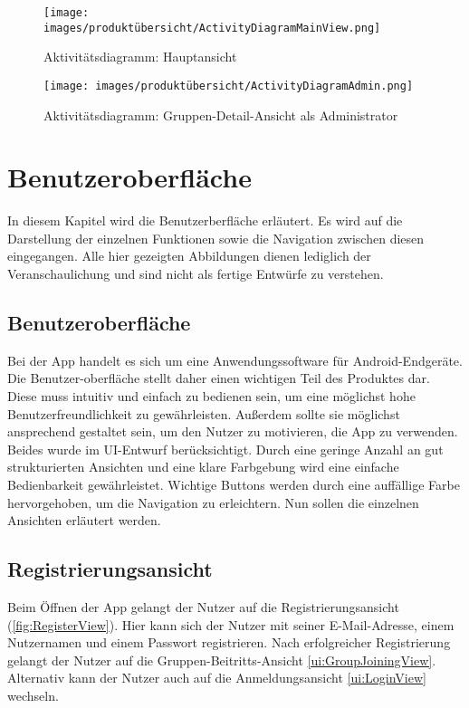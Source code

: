 \documentclass[parskip=full]{scrartcl}
\newcommand{\changelocaltocdepth}[1]{%
  \addtocontents{toc}{\protect\setcounter{tocdepth}{#1}}%
  \setcounter{tocdepth}{#1}%
}
\newcommand{\enablesubsectionnumbering}[1]{
    \renewcommand{\thesubsection}{$\langle$#1\arabic{subsection}0$\rangle$}
    \changelocaltocdepth{1} 
}
\begin{document}
\begin{figure}[!htp]
    \centering
    \texttt{[image: images/produktübersicht/ActivityDiagramMainView.png]}
    \caption{Aktivitätsdiagramm: Hauptansicht}
    \label{fig:ActivityDiagramMainView}
\end{figure}
\newpage

\begin{figure}[!htp]
    \centering
    \begin{adjustbox}{right=150mm}
        \texttt{[image: images/produktübersicht/ActivityDiagramAdmin.png]}
    \end{adjustbox}

    \caption{Aktivitätsdiagramm: Gruppen-Detail-Ansicht als Administrator}
    \label{fig:ActivityDiagramAdmin}
\end{figure}
\newpage

\section{Benutzeroberfläche}
\setcounter{figure}{0} 
\enablesubsectionnumbering{UI}
In diesem Kapitel wird die Benutzerberfläche erläutert. Es wird auf die Darstellung der einzelnen Funktionen sowie die Navigation zwischen diesen eingegangen. Alle hier gezeigten Abbildungen dienen lediglich der Veranschaulichung und sind nicht als fertige Entwürfe zu verstehen.

\subsection*{Benutzeroberfläche}
Bei der App handelt es sich um eine Anwendungssoftware für Android-Endgeräte. Die Benutzer-oberfläche stellt daher einen wichtigen Teil des Produktes dar. Diese muss intuitiv und einfach zu bedienen sein, um eine möglichst hohe Benutzerfreundlichkeit zu gewährleisten. Außerdem sollte sie möglichst ansprechend gestaltet sein, um den Nutzer zu motivieren, die App zu verwenden. Beides wurde im UI-Entwurf berücksichtigt. Durch eine geringe Anzahl an gut strukturierten Ansichten und eine klare Farbgebung wird eine einfache Bedienbarkeit gewährleistet. Wichtige Buttons werden durch eine auffällige Farbe hervorgehoben, um die Navigation zu erleichtern. Nun sollen die einzelnen Ansichten erläutert werden.

\subsection{Registrierungsansicht}
\label{ui:RegisterView}
Beim Öffnen der App gelangt der Nutzer auf die Registrierungsansicht (\autoref{fig:RegisterView}). Hier kann sich der Nutzer mit seiner E-Mail-Adresse, einem Nutzernamen und einem Passwort registrieren. Nach erfolgreicher Registrierung gelangt der Nutzer auf die Gruppen-Beitritts-Ansicht \ref{ui:GroupJoiningView}. Alternativ kann der Nutzer auch auf die Anmeldungsansicht \ref{ui:LoginView} wechseln.
\end{document}
